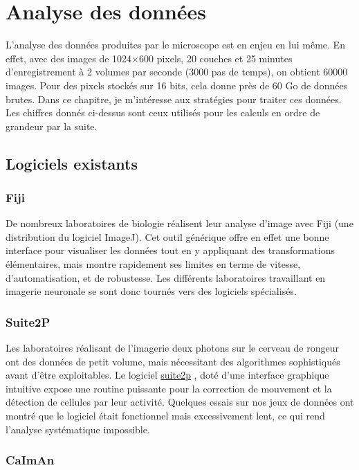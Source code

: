\section{Analyse des données}

L'analyse des données produites par le microscope est en enjeu en lui même. En effet, avec des images de 1024$\times$600 pixels, 20 couches et 25 minutes d'enregistrement à 2 volumes par seconde (3000 pas de temps), on obtient 60000 images. Pour des pixels stockés sur 16 bits, cela donne près de 60 Go de données brutes. Dans ce chapitre, je m'intéresse aux stratégies pour traiter ces données. Les chiffres donnés ci-dessus sont ceux utilisés pour les calculs en ordre de grandeur par la suite.

\subsection{Logiciels existants}

\subsubsection{Fiji}

De nombreux laboratoires de biologie réalisent leur analyse d'image avec Fiji (une distribution du logiciel ImageJ). Cet outil générique offre en effet une bonne interface pour visualiser les données tout en y appliquant des transformations élémentaires, mais montre rapidement ses limites en terme de vitesse, d'automatisation, et de robustesse. Les différents laboratoires travaillant en imagerie neuronale se sont donc tournés vers des logiciels spécialisés.

\subsubsection{Suite2P}

Les laboratoires réalisant de l'imagerie deux photons sur le cerveau de rongeur ont des données de petit volume, mais nécessitant des algorithmes sophistiqués avant d'être exploitables. Le logiciel \href{https://www.suite2p.org/}{suite2p} \cite{pachitariu_suite2p_2016}, doté d'une interface graphique intuitive expose une routine puissante pour la correction de mouvement et la détection de cellules par leur activité. Quelques essais sur nos jeux de données ont montré que le logiciel était fonctionnel mais excessivement lent, ce qui rend l'analyse systématique impossible.

\subsubsection{CaImAn}

